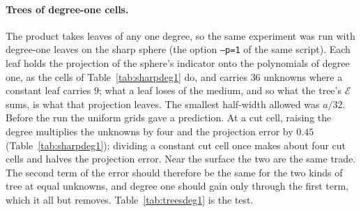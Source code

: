 \documentclass[11pt,a4paper]{article}
\newcommand{\cE}{\mathcal{E}}
\begin{document}
\paragraph{Trees of degree-one cells.} The product takes leaves of any one degree, so the same experiment
was run with degree-one leaves on the sharp sphere (the option \texttt{--p=1} of the same script). Each
leaf holds the projection of the sphere's indicator onto the polynomials of degree one, as the cells of
Table~\ref{tab:sharpdeg1} do, and carries $36$ unknowns where a constant leaf carries $9$; what a leaf
loses of the medium, and so what the tree's $\cE$ sums, is what that projection leaves. The smallest
half-width allowed was $a/32$. Before the run the uniform grids gave a prediction. At a cut cell,
raising the degree multiplies the unknowns by four and the projection error by $0.45$
(Table~\ref{tab:sharpdeg1}); dividing a constant cut cell once makes about four cut cells and halves the
projection error. Near the surface the two are the same trade. The second term of the error should
therefore be the same for the two kinds of tree at equal unknowns, and degree one should gain only
through the first term, which it all but removes. Table~\ref{tab:treesdeg1} is the test.
\end{document}
